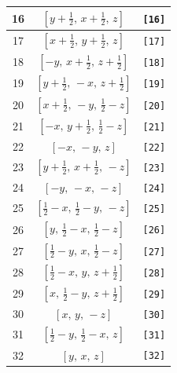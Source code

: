 \documentclass[fleqn,8pt]{jsarticle}
\begin{document}
\begin{longtable}{ccc}
16 & $\left[ y + \frac{1}{2},\, x + \frac{1}{2},\, z \right]$ & {\tt [16]} \\ \hline
17 & $\left[ x + \frac{1}{2},\, y + \frac{1}{2},\, z \right]$ & {\tt [17]} \\ \hline
18 & $\left[ - y,\, x + \frac{1}{2},\, z + \frac{1}{2} \right]$ & {\tt [18]} \\ \hline
19 & $\left[ y + \frac{1}{2},\, - x,\, z + \frac{1}{2} \right]$ & {\tt [19]} \\ \hline
20 & $\left[ x + \frac{1}{2},\, - y,\, \frac{1}{2} - z \right]$ & {\tt [20]} \\ \hline
21 & $\left[ - x,\, y + \frac{1}{2},\, \frac{1}{2} - z \right]$ & {\tt [21]} \\ \hline
22 & $\left[ - x,\, - y,\, z \right]$ & {\tt [22]} \\ \hline
23 & $\left[ y + \frac{1}{2},\, x + \frac{1}{2},\, - z \right]$ & {\tt [23]} \\ \hline
24 & $\left[ - y,\, - x,\, - z \right]$ & {\tt [24]} \\ \hline
25 & $\left[ \frac{1}{2} - x,\, \frac{1}{2} - y,\, - z \right]$ & {\tt [25]} \\ \hline
26 & $\left[ y,\, \frac{1}{2} - x,\, \frac{1}{2} - z \right]$ & {\tt [26]} \\ \hline
27 & $\left[ \frac{1}{2} - y,\, x,\, \frac{1}{2} - z \right]$ & {\tt [27]} \\ \hline
28 & $\left[ \frac{1}{2} - x,\, y,\, z + \frac{1}{2} \right]$ & {\tt [28]} \\ \hline
29 & $\left[ x,\, \frac{1}{2} - y,\, z + \frac{1}{2} \right]$ & {\tt [29]} \\ \hline
30 & $\left[ x,\, y,\, - z \right]$ & {\tt [30]} \\ \hline
31 & $\left[ \frac{1}{2} - y,\, \frac{1}{2} - x,\, z \right]$ & {\tt [31]} \\ \hline
32 & $\left[ y,\, x,\, z \right]$ & {\tt [32]} \\
\end{longtable}
\end{document}
